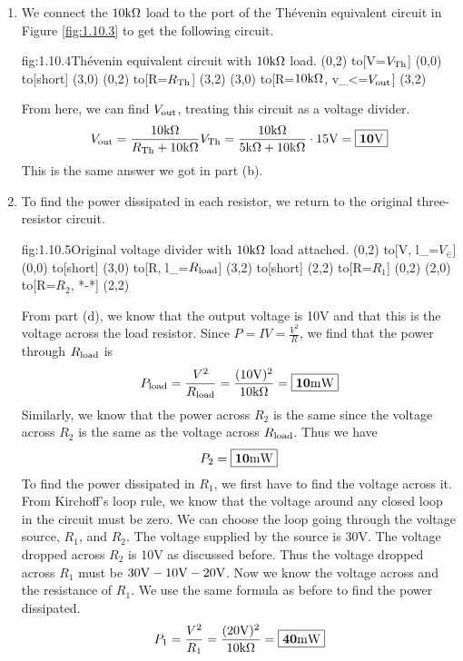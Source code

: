 \documentclass{article}
\begin{document}
\begin{enumerate}
        The Th\'evenin equivalent circuit takes the form shown below.
        \begin{circuit}{fig:1.10.3}{Th\'evenin equivalent circuit.}
            (0,2) to[V=$V_{\Th}$] (0,0)
            to[short, -o] (3,0)
            (0,2) to[R=$R_{\Th}$, -o] (3,2)
            (3,0) to[open, v_<=$V_\out$] (3,2)
        \end{circuit}
        In terms of behavior at the ports, this circuit is equivalent to the circuit in Figure \ref{fig:1.10.1}. 

        \item 
        We connect the $10\text{k}\Omega$ load to the port of the Th\'evenin equivalent circuit in Figure \ref{fig:1.10.3} to get the following circuit.
        \begin{circuit}{fig:1.10.4}{Th\'evenin equivalent circuit with $10\text{k}\Omega$ load.}
            (0,2) to[V=$V_{\Th}$] (0,0)
            to[short] (3,0)
            (0,2) to[R=$R_{\Th}$] (3,2)
            (3,0) to[R=$10\text{k}\Omega$, v_<=$V_\out$] (3,2)
        \end{circuit}
        From here, we can find $V_\out$, treating this circuit as a voltage divider.
        \[V_{\text{out}} = \frac{10\text{k}\Omega}{R_{\text{Th}} + 10\text{k}\Omega} V_{\text{Th}} = \frac{10\text{k}\Omega}{5\text{k}\Omega + 10\text{k}\Omega} \cdot 15\text{V} = \boxed{\mathbf{10\text{V}}}\] 
        This is the same answer we got in part (b).

        \item 
        To find the power dissipated in each resistor, we return to the original three-resistor circuit. 
        \begin{circuit}{fig:1.10.5}{Original voltage divider with $10\text{k}\Omega$ load attached.}
            (0,2) to[V, l_=$V_\in$] (0,0)
                to[short] (3,0)
                to[R, l_=$R_{\text{load}}$] (3,2)
                to[short] (2,2)
                to[R=$R_1$] (0,2)
            (2,0) to[R=$R_2$, *-*] (2,2)
        \end{circuit}

        From part (d), we know that the output voltage is 10V and that this is the voltage across the load resistor. Since $P = IV = \frac{V^2}{R}$, we find that the power through $R_{\text{load}}$ is 
        \[P_{\text{load}} = \frac{V^2}{R_{\text{load}}} = \frac{(10\text{V})^2}{10\text{k}\Omega} = \boxed{\mathbf{10\text{m}\text{W}}}\]
        Similarly, we know that the power across $R_2$ is the same since the voltage across $R_2$ is the same as the voltage across $R_{\text{load}}$. Thus we have
        \[P_2 = \boxed{\mathbf{10\text{m}\text{W}}}\]
        To find the power dissipated in $R_1$, we first have to find the voltage across it. From Kirchoff's loop rule, we know that the voltage around any closed loop in the circuit must be zero. We can choose the loop going through the voltage source, $R_1$, and $R_2$. The voltage supplied by the source is 30V. The voltage dropped across $R_2$ is 10V as discussed before. Thus the voltage dropped across $R_1$ must be $30\text{V} - 10\text{V} - 20\text{V}$. Now we know the voltage across and the resistance of $R_1$. We use the same formula as before to find the power dissipated.
        \[P_1 = \frac{V^2}{R_1} = \frac{(20\text{V})^2}{10\text{k}\Omega} = \boxed{\mathbf{40\text{m}\text{W}}}\]
    \end{enumerate}
\end{document}
